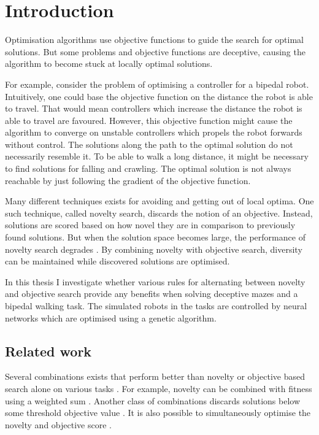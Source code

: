 \section{Introduction}

\label{sec:intro}

Optimisation algorithms use objective functions to guide the search for optimal solutions.
But some problems and objective functions are deceptive, causing the algorithm to become stuck at
locally optimal solutions.

For example, consider the problem of optimising a controller for a bipedal
robot. Intuitively, one could base the objective function on the distance the robot is able to travel.
That would mean controllers which increase the distance the robot is able to travel are favoured.
However, this objective function might cause the algorithm to converge on unstable controllers which
propels the robot forwards without control. The solutions along the path to the optimal solution
do not necessarily resemble it. To be able to walk a long distance, it might be necessary to find
solutions for falling and crawling. The optimal solution is not always reachable by just
following the gradient of the objective function.

Many different techniques exists for avoiding and getting out of local optima. One such technique, called
novelty search, discards the notion of an objective. Instead, solutions are scored based on how novel
they are in comparison to previously found solutions. But when the solution space becomes large, the performance
of novelty search degrades \cite{novelty_not_enough}. By combining novelty with objective search, diversity
can be maintained while discovered solutions are optimised.

In this thesis I investigate whether various rules for alternating between novelty and
objective search provide any benefits when solving deceptive mazes and a bipedal
walking task. The simulated robots in the tasks are controlled by neural networks
which are optimised using a genetic algorithm.

\subsection{Related work}
Several combinations exists that perform better than novelty or objective based search alone
on various tasks \cite{ns_study}. For example, novelty can be combined with fitness using a
weighted sum \cite{novelty_not_enough}. Another class of combinations discards solutions below
some threshold objective value \cite{minimal_ns}. It is also possible to simultaneously optimise
the novelty and objective score \cite{multi_ns}.
